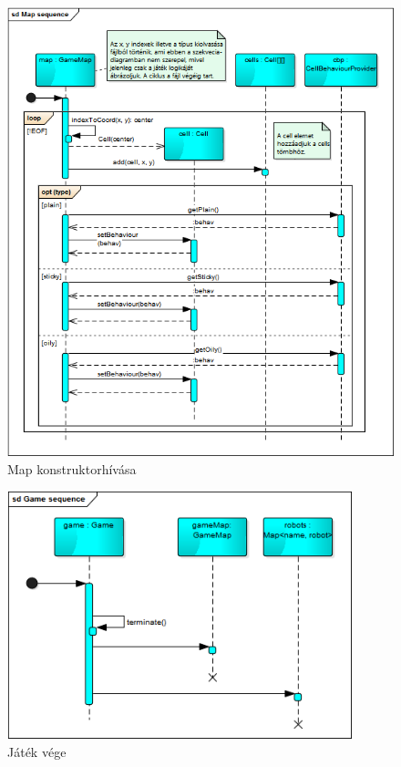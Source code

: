 \begin{figure}[!htbp]
	\begin{center}
		\includegraphics[width=\textwidth, center]{./chapters/chapter03/map.png}
		\caption{Map konstruktorhívása}
	\end{center}
\end{figure}

\begin{figure}[!htbp]
	\begin{center}
		\includegraphics[width=10cm, center]{./chapters/chapter03/endgame.png}
		\caption{Játék vége}
	\end{center}
\end{figure}



\clearpage


